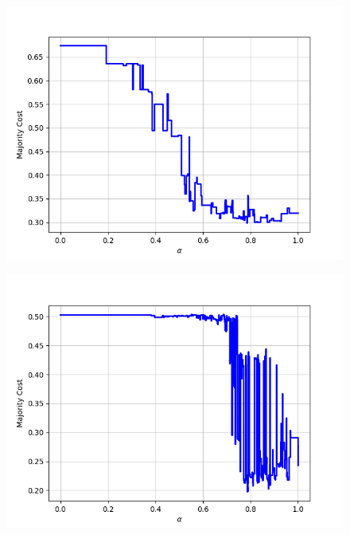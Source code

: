 \begin{figure}[h]
\begin{minipage}{.24\textwidth}
\end{minipage}
\begin{minipage}{.24\textwidth}
  \centering
  {\includegraphics[width=\linewidth]{plots/nell-sc/building}}
\end{minipage}
\begin{minipage}{.24\textwidth}
  \centering
  {\includegraphics[width=\linewidth]{plots/nell-sc/company}}
\end{minipage}
\begin{minipage}{.24\textwidth}
  \centering

\end{minipage}
\end{figure}
